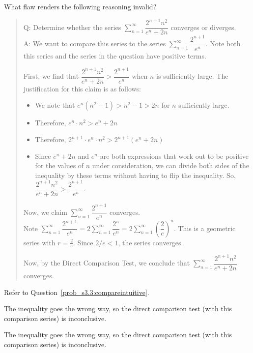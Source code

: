 \begin{question}
What flaw renders the following reasoning invalid?
\begin{quote}\color{blue}
Q: Determine whether the series
$\displaystyle\sum_{n=1}^\infty \dfrac{2^{n+1}n^2}{e^n+2n}$
converges or diverges.\\
A: We want to compare this series to the series $\displaystyle\sum_{n=1}^\infty \dfrac{2^{n+1}}{e^n}$. Note both this series and the series in the question have positive terms.

First, we find that $\dfrac{2^{n+1}n^2}{e^n+2n} > \dfrac{2^{n+1}}{e^n}$ when $n$ is sufficiently large. The justification for this claim is as follows:
\begin{itemize}
\item We note that $e^n(n^2-1)>n^2-1>2n$ for $n$ sufficiently large.
\item Therefore, $e^n \cdot n^2 > e^n+2n$
\item Therefore, $2^{n+1}\cdot e^n \cdot n^2 > 2^{n+1}(e^n+2n)$
\item Since $e^n+2n$ and $e^n$ are both expressions that work out to be positive for the values of $n$ under consideration, we can divide both sides of the inequality by these terms without having to flip the inequality. So,
$\dfrac{2^{n+1}n^2}{e^n+2n}>\dfrac{2^{n+1}}{e^n}$.
\end{itemize}
Now, we claim  $\displaystyle\sum_{n=1}^\infty \dfrac{2^{n+1}}{e^n}$ converges.\\
 Note  $\displaystyle\sum_{n=1}^\infty \dfrac{2^{n+1}}{e^n}= 2\displaystyle\sum_{n=1}^\infty \dfrac{2^{n}}{e^n}= 2\displaystyle\sum_{n=1}^\infty \left(\dfrac{2}{e}\right)^n$. This is a geometric series with $r=\frac{2}{e}$. Since $2/e <1$, the series converges.

 Now, by the Direct Comparison Test, we conclude that $\displaystyle\sum_{n=1}^\infty \dfrac{2^{n+1}n^2}{e^n+2n}$ converges.
 \end{quote}
\end{question}
\begin{hint}
Refer to Question~\ref{prob_s3.3:compareintuitive}.
\end{hint}
\begin{answer}
The inequality goes the wrong way, so the direct comparison test (with this comparison series) is inconclusive.
\end{answer}
\begin{solution}
The inequality goes the wrong way, so the direct comparison test (with this comparison series) is inconclusive.
\end{solution}


